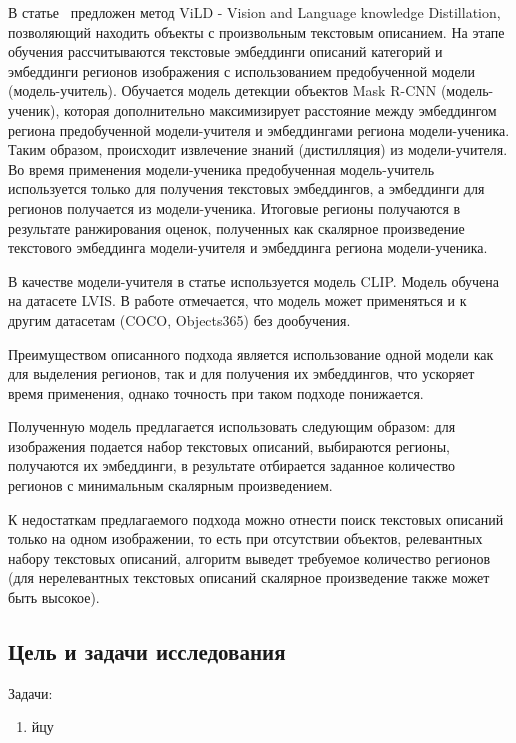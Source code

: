 \documentclass[a4paper,14pt]{article}
\begin{document}
	В статье~\cite{ViLD} предложен метод ViLD - Vision and Language knowledge Distillation, позволяющий находить объекты с произвольным текстовым описанием. 
	На этапе обучения рассчитываются текстовые эмбеддинги описаний категорий и эмбеддинги регионов изображения с использованием предобученной модели (модель-учитель). 
	Обучается модель детекции объектов Mask R-CNN (модель-ученик), которая дополнительно максимизирует расстояние между эмбеддингом региона предобученной модели-учителя и эмбеддингами региона модели-ученика. 
	Таким образом, происходит извлечение знаний (дистилляция) из модели-учителя. 
	Во время применения модели-ученика предобученная модель-учитель используется только для получения текстовых эмбеддингов, а эмбеддинги для регионов получается из модели-ученика. 
	Итоговые регионы получаются в результате ранжирования оценок, полученных как скалярное произведение текстового эмбеддинга модели-учителя и эмбеддинга региона модели-ученика.
	 
	В качестве модели-учителя в статье используется модель CLIP. 
	Модель обучена на датасете LVIS. В работе отмечается, что модель может применяться и к другим датасетам (COCO, Objects365) без дообучения.
	
	Преимуществом описанного подхода является использование одной модели как для выделения регионов, так и для получения их эмбеддингов, что ускоряет время применения, однако точность при таком подходе понижается.
	
	Полученную модель предлагается использовать следующим образом: для изображения подается набор текстовых описаний, выбираются регионы, получаются их эмбеддинги, в результате отбирается заданное количество регионов с минимальным скалярным произведением. 
	
	К недостаткам предлагаемого подхода можно отнести поиск текстовых описаний только на одном изображении, то есть при отсутствии объектов, релевантных набору текстовых описаний, алгоритм  выведет требуемое количество регионов (для нерелевантных текстовых описаний скалярное произведение также может быть высокое).
	
    \subsection{Цель и задачи исследования}

    Задачи:
    \begin{enumerate}
        [1)]
        \itemsep0em
        \item йцу

    \end{enumerate}
\end{document}
